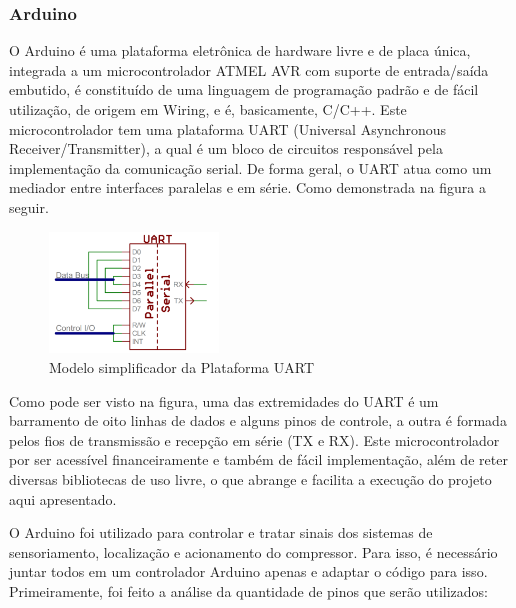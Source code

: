 \subsubsection{Arduino}
O Arduino é uma plataforma eletrônica de hardware livre e de placa única, integrada a um microcontrolador ATMEL AVR com suporte de entrada/saída embutido, é constituído de uma linguagem de programação padrão e de fácil utilização, de origem em Wiring, e é, basicamente, C/C++. Este microcontrolador tem uma plataforma UART (Universal Asynchronous Receiver/Transmitter), a qual é um bloco de circuitos
responsável pela implementação da comunicação serial. De forma geral, o UART atua como um mediador entre interfaces paralelas e em série. Como demonstrada na figura a seguir.

\begin{figure}[H]
\centering
\includegraphics[width=0.4\textwidth]{figuras/uart}
 \caption{ Modelo simplificador da Plataforma UART}
\label{fig:uart}
\end{figure}

Como pode ser visto na figura, uma das extremidades do UART é um barramento de oito linhas de dados e alguns pinos de controle, a outra é formada pelos fios de transmissão e recepção em série (TX e RX). Este microcontrolador por ser acessível financeiramente e também de fácil implementação, além de reter diversas bibliotecas de uso livre, o que abrange e facilita a execução do projeto aqui apresentado.

O Arduino foi utilizado para controlar e tratar sinais dos sistemas de sensoriamento, localização e acionamento do compressor. Para isso, é necessário juntar todos em um controlador Arduino apenas e adaptar o código para isso. Primeiramente, foi feito a análise da quantidade de pinos que serão utilizados:

